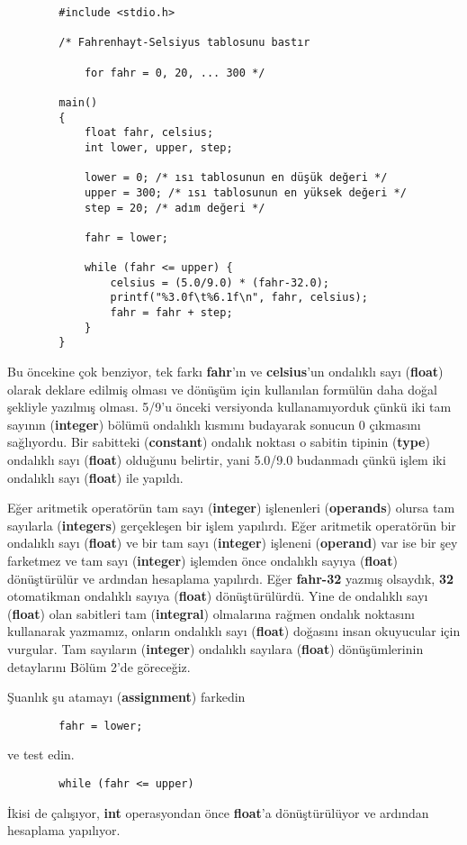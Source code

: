 \documentclass[a4paper,12pt,oneside]{book}
\begin{document}
\begin{lstlisting}
        #include <stdio.h>

        /* Fahrenhayt-Selsiyus tablosunu bastır

            for fahr = 0, 20, ... 300 */

        main()
        {
            float fahr, celsius;
            int lower, upper, step;

            lower = 0; /* ısı tablosunun en düşük değeri */
            upper = 300; /* ısı tablosunun en yüksek değeri */
            step = 20; /* adım değeri */

            fahr = lower;

            while (fahr <= upper) {
                celsius = (5.0/9.0) * (fahr-32.0);
                printf("%3.0f\t%6.1f\n", fahr, celsius);
                fahr = fahr + step;
            }
        }
\end{lstlisting}
\par Bu öncekine çok benziyor, tek farkı \textbf{fahr}'ın ve \textbf{celsius}'un ondalıklı sayı (\textbf{float}) olarak deklare edilmiş olması ve dönüşüm için kullanılan formülün daha doğal şekliyle yazılmış olması. 5/9'u önceki versiyonda kullanamıyorduk çünkü iki tam sayının (\textbf{integer}) bölümü ondalıklı kısmını budayarak sonucun 0 çıkmasını sağlıyordu. Bir sabitteki (\textbf{constant}) ondalık noktası o sabitin tipinin (\textbf{type}) ondalıklı sayı (\textbf{float}) olduğunu belirtir, yani 5.0/9.0 budanmadı çünkü işlem iki ondalıklı sayı (\textbf{float}) ile yapıldı.
\par Eğer aritmetik operatörün tam sayı (\textbf{integer}) işlenenleri (\textbf{operands}) olursa tam sayılarla (\textbf{integers}) gerçekleşen bir işlem yapılırdı. Eğer aritmetik operatörün bir ondalıklı sayı (\textbf{float}) ve bir tam sayı (\textbf{integer}) işleneni (\textbf{operand}) var ise bir şey farketmez ve tam sayı (\textbf{integer}) işlemden önce ondalıklı sayıya (\textbf{float}) dönüştürülür ve ardından hesaplama yapılırdı. Eğer \textbf{fahr-32} yazmış olsaydık, \textbf{32} otomatikman ondalıklı sayıya (\textbf{float}) dönüştürülürdü. Yine de ondalıklı sayı (\textbf{float}) olan sabitleri tam (\textbf{integral}) olmalarına rağmen ondalık noktasını kullanarak yazmamız, onların ondalıklı sayı (\textbf{float}) doğasını insan okuyucular için vurgular. Tam sayıların (\textbf{integer}) ondalıklı sayılara (\textbf{float}) dönüşümlerinin detaylarını Bölüm 2'de göreceğiz.


\pagebreak Şuanlık şu atamayı (\textbf{assignment}) farkedin
\begin{lstlisting}
        fahr = lower;
\end{lstlisting} ve test edin.
\begin{lstlisting}
        while (fahr <= upper)
\end{lstlisting} İkisi de çalışıyor, \textbf{int} operasyondan önce \textbf{float}'a dönüştürülüyor ve ardından hesaplama yapılıyor.
\end{document}
